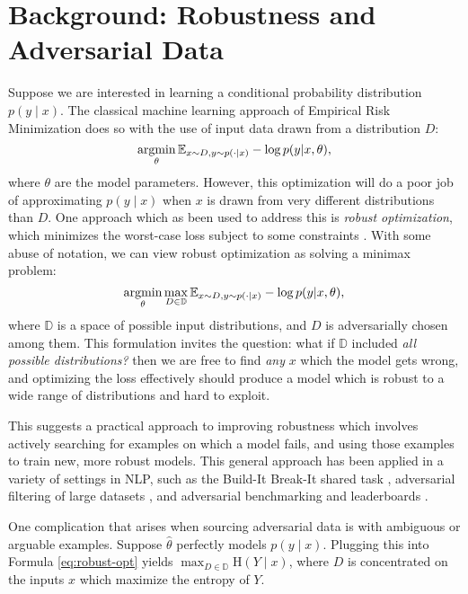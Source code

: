 \documentclass[10pt,a4paper]{article}
\begin{document}
\section{Background: Robustness and Adversarial Data}
Suppose we are interested in learning a conditional probability distribution $p(y \mid x)$.
The classical machine learning approach of Empirical Risk Minimization does so with the use of input data drawn from a distribution $D$:
\begin{equation}
\operatorname*{argmin}_\theta \mathbb{E}_{x \sim D, y \sim p(\cdot \mid x)} -\log p(y | x, \theta),
\label{eq:erm-opt}
\end{equation}
where $\theta$ are the model parameters.
However, this optimization will do a poor job of approximating $p(y \mid x)$ when $x$ is drawn from very different distributions than $D$.
One approach which as been used to address this is \textit{robust optimization}, which minimizes the worst-case loss subject to some constraints \citep{madry-etal-2018-towards, ghaoui-lebret-1997-robust,wald-1945-statistical}.
With some abuse of notation, we can view robust optimization as solving a minimax problem:
\begin{equation}
\operatorname*{argmin}_\theta \max_{D \in \mathbb{D}} \mathbb{E}_{x \sim D, y \sim p(\cdot \mid x)} -\log p(y | x, \theta),
\label{eq:robust-opt}
\end{equation}
where $\mathbb{D}$ is a space of possible input distributions, and $D$ is adversarially chosen among them.
This formulation invites the question: what if $\mathbb{D}$ included \textit{all possible distributions?} then we are free to find \textit{any} $x$ which the model gets wrong, and optimizing the loss effectively should produce a model which is robust to a wide range of distributions and hard to exploit.

This suggests a practical approach to improving robustness which involves actively searching for examples on which a model fails, and using those examples to train new, more robust models. This general approach has been applied in a variety of settings in NLP, such as the Build-It Break-It shared task \citep{ettinger-etal-2017-towards}, adversarial filtering of large datasets \citep{zellers-etal-2018-swag,sakaguchi-etal-2020-winogrande}, and adversarial benchmarking and leaderboards \citep{nie-etal-2020-adversarial,kiela-etal-2021-dynabench}.

One complication that arises when sourcing adversarial data is with ambiguous or arguable examples.
Suppose $\hat{\theta}$ perfectly models $p(y \mid x)$. Plugging this into Formula \ref{eq:robust-opt} yields $\max_{D \in \mathbb{D}} \text{H}(Y \mid x)$, where $D$ is concentrated on the inputs $x$ which maximize the entropy of $Y$.
\end{document}
